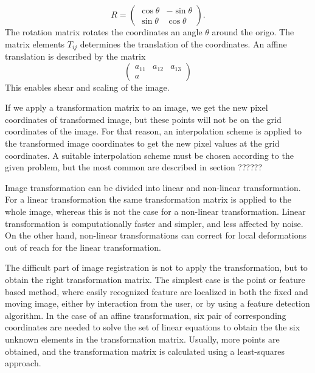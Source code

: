 \begin{equation}
	R = 
	\begin{pmatrix}
	\cos \theta & -\sin \theta\\
	\sin \theta & \cos \theta
	\end{pmatrix}.
\end{equation}
The rotation matrix rotates the coordinates an angle $\theta$ around the origo. The matrix elements $T_{ij}$ determines the translation of the coordinates. An affine translation is described by the matrix 
\begin{equation}
\begin{pmatrix}
 a_{11}&a_{12}&a_{13}\\
 a
 
\end{pmatrix}
\end{equation} This enables shear and scaling of the image.

If we apply a transformation matrix to an image, we get the new pixel coordinates of transformed image, but these points will not be on the grid coordinates of the image. For that reason, an interpolation scheme is applied to the transformed image coordinates to get the new pixel values at the grid coordinates. A suitable interpolation scheme must be chosen according to the given problem, but the most common are described in section ??????

Image transformation can be divided into linear and non-linear transformation. For a linear transformation the same transformation matrix is applied to the whole image, whereas this is not the case for a non-linear transformation. Linear transformation is computationally faster and simpler, and less affected by noise. On the other hand, non-linear transformations can correct for local deformations out of reach for the linear transformation. 

The difficult part of image registration is not to apply the transformation, but to obtain the right transformation matrix. The simplest case is the point or feature based method, where easily recognized feature are localized in both the fixed and moving image, either by interaction from the user, or by using a feature detection algorithm. In the case of an affine transformation, six pair of corresponding coordinates are needed to solve the set of linear equations to obtain the the six unknown elements in the transformation matrix. Usually, more points are obtained, and the transformation matrix is calculated using a least-squares approach. 

